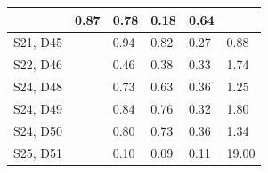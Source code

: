 \begin{table}[h]
\begin{tabular}{  l  p{6cm} p{1cm}  p{1cm} p{1cm} p{1cm}}
& 0.87
& 0.78
& 0.18
& 0.64 \\\hline
S21, D45
&\cite{van2006bacterial} 
& 0.94
& 0.82
& 0.27
& 0.88 \\\hline
S22, D46
&\cite{bell2005larger} 
& 0.46
& 0.38
& 0.33
& 1.74 \\\hline
S24, D48
&\cite{van2005island} 
& 0.73
& 0.63
& 0.36
& 1.25 \\\hline
S24, D49
&\cite{van2005island} 
& 0.84
& 0.76
& 0.32
& 1.80 \\\hline
S24, D50
&\cite{van2005island} 
& 0.80
& 0.73
& 0.36
& 1.34 \\\hline
S25, D51
&\cite{karatayev2005community} 
& 0.10
& 0.09
& 0.11
& 19.00  \\
        \bottomrule
    \end{tabular}
\end{table}

